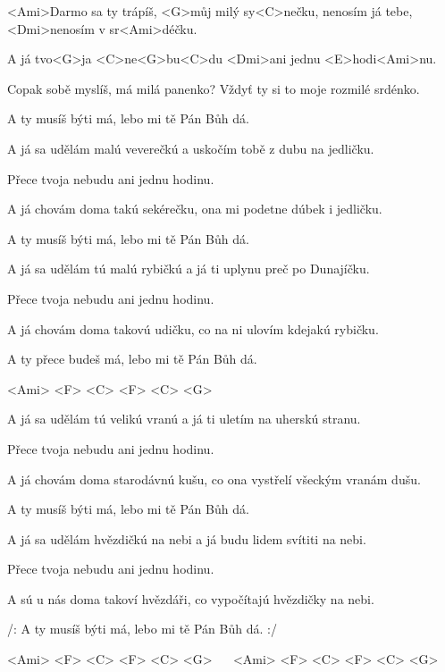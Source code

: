 

\zs
<Ami>Darmo sa ty trápíš, <G>můj milý sy<C>nečku, nenosím já tebe, <Dmi>nenosím v sr<Ami>déčku.

A já tvo<G>ja <C>ne<G>bu<C>du <Dmi>ani jednu <E>hodi<Ami>nu.
\ks

\zs
Copak sobě myslíš, má milá panenko? Vždyť ty si to moje rozmilé srdénko.

A ty musíš býti má, lebo mi tě Pán Bůh dá.
\ks

\zs
A já sa udělám malú veverečkú a uskočím tobě z dubu na jedličku.

Přece tvoja nebudu ani jednu hodinu.
\ks

\zs
A já chovám doma takú sekérečku, ona mi podetne dúbek i jedličku.

A ty musíš býti má, lebo mi tě Pán Bůh dá.
\ks

\zs
A já sa udělám tú malú rybičkú a já ti uplynu preč po Dunajíčku.

Přece tvoja nebudu ani jednu hodinu.
\ks

\zs
A já chovám doma takovú udičku, co na ni ulovím kdejakú rybičku.

A ty přece budeš má, lebo mi tě Pán Bůh dá.
\ks

\zr
<Ami> <F> <C> <F> <C> <G>
\kr

\zs
A já sa udělám tú velikú vranú a já ti uletím na uherskú stranu.

Přece tvoja nebudu ani jednu hodinu.
\ks

\zs
A já chovám doma starodávnú kušu, co ona vystřelí všeckým vranám dušu.

A ty musíš býti má, lebo mi tě Pán Bůh dá.
\ks

\zs
A já sa udělám hvězdičkú na nebi a já budu lidem svítiti na nebi.

Přece tvoja nebudu ani jednu hodinu.
\ks

\zs
A sú u nás doma takoví hvězdáři, co vypočítajú hvězdičky na nebi.

/: A ty musíš býti má, lebo mi tě Pán Bůh dá. :/
\ks

\zr
<Ami> <F> <C> <F> <C> <G> ~~
<Ami> <F> <C> <F> <C> <G>
\kr

\kp
